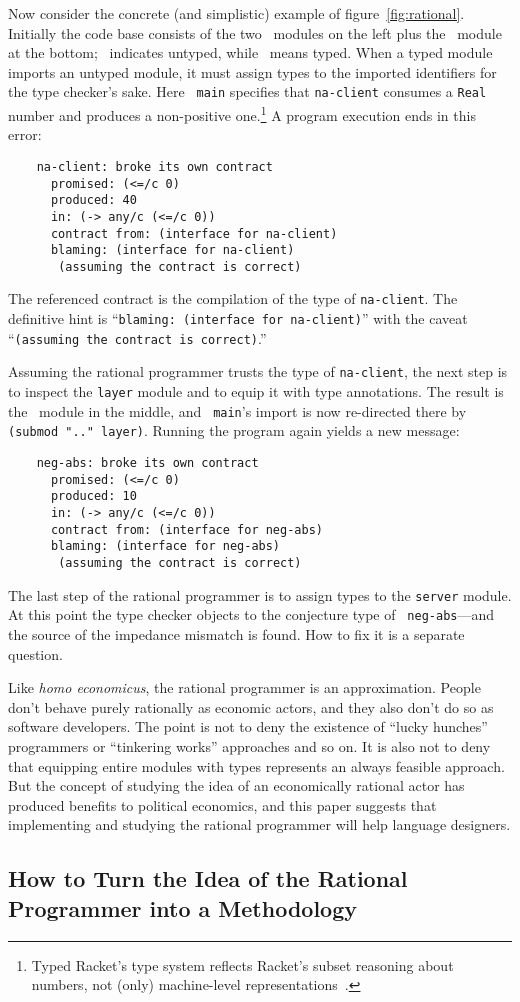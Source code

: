 Now consider the concrete (and simplistic) example of figure~\ref{fig:rational}.
Initially the code base consists of the two \dyncolor\ modules on the left plus
the \typecolor\ module at the bottom; \dyncolor\ indicates untyped, while
\typecolor\ means typed. When a typed module imports an untyped module, it must
assign types to the imported identifiers for the type checker's sake. Here {\tt
main} specifies that {\tt na-client} consumes a {\tt Real} number and produces a
non-positive one.\footnote{Typed Racket's type system reflects Racket's subset
reasoning about numbers, not (only) machine-level
representations~\cite{stathff-padl-12}.} A program execution ends in this error:
\begin{verbatim}
    na-client: broke its own contract
      promised: (<=/c 0)
      produced: 40
      in: (-> any/c (<=/c 0))           
      contract from: (interface for na-client)
      blaming: (interface for na-client)
       (assuming the contract is correct)
\end{verbatim}
The referenced contract is the compilation of the type of {\tt na-client}. The
definitive hint is ``{\tt blaming: (interface for na-client)}'' with the caveat
``{\tt (assuming the contract is correct)}.''

Assuming the rational programmer trusts the type of {\tt na-client}, the next
step is to inspect the {\tt layer} module and to equip it with type
annotations. The result is the \typecolor\ module in the middle, and {\tt
main}'s import is now re-directed there by {\tt (submod ".." layer)}. Running the
program again yields a new message:
\begin{verbatim}
    neg-abs: broke its own contract
      promised: (<=/c 0)
      produced: 10
      in: (-> any/c (<=/c 0))
      contract from: (interface for neg-abs)
      blaming: (interface for neg-abs)
       (assuming the contract is correct)
\end{verbatim}
The last step of the rational programmer is to assign types to the {\tt server}
module. At this point the type checker objects to the conjecture type of {\tt
neg-abs}---and the source of the impedance mismatch is found. How to fix it is a
separate question.

Like {\it homo economicus\/}, the rational programmer is an
approximation.  People don't behave purely rationally as economic
actors, and they also don't do so as software developers. The point is
not to deny the existence of ``lucky hunches'' programmers or
``tinkering works'' approaches and so on. It is also not to deny that
equipping entire modules with types represents an always feasible
approach.  But the concept of studying the idea of an economically
rational actor has produced benefits to political economics, and this
paper suggests that implementing and studying the rational programmer
will help language designers.

\subsection{How to Turn the Idea of the Rational Programmer into a Methodology} 
\label{sub:methodology}


